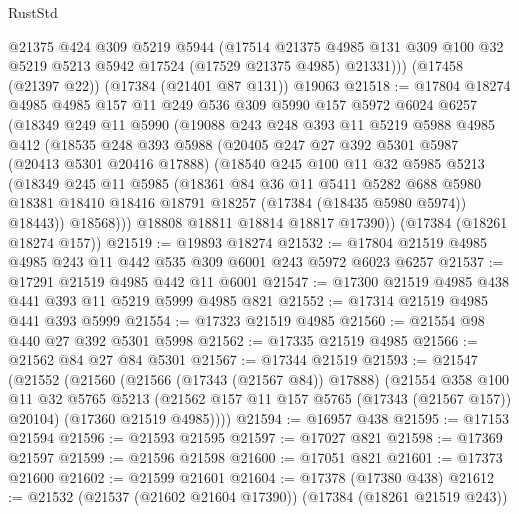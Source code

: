 \begin{lexlean}{RustStd}
\begin{coremodule}
        @21375
        @424
        @309
        @5219
        @5944
        (@17514
          @21375
          @4985
          @131
          @309
          @100
          @32
          @5219
          @5213
          @5942
          @17524
          (@17529 @21375 @4985)
          @21331)))
    (@17458 (@21397 @22))
    (@17384 (@21401 @87 @131))
    @19063
@21518 := @17804
    @18274
    @4985
    @4985
    @157
    @11
    @249
    @536
    @309
    @5990
    @157
    @5972
    @6024
    @6257
    (@18349
      @249
      @11
      @5990
      (@19088
        @243
        @248
        @393
        @11
        @5219
        @5988
        @4985
        @412
        (@18535
          @248
          @393
          @5988
          (@20405
            @247
            @27
            @392
            @5301
            @5987
            (@20413 @5301 @20416 @17888)
            (@18540
              @245
              @100
              @11
              @32
              @5985
              @5213
              (@18349
                @245
                @11
                @5985
                (@18361
                  @84
                  @36
                  @11
                  @5411
                  @5282
                  @688
                  @5980
                  @18381
                  @18410
                  @18416
                  @18791
                  @18257
                  (@17384 (@18435 @5980 @5974))
                  @18443))
              @18568)))
        @18808
        @18811
        @18814
        @18817
        @17390))
    (@17384 (@18261 @18274 @157))
@21519 := @19893 @18274
@21532 := @17804 @21519 @4985 @4985 @243 @11 @442 @535 @309 @6001 @243 @5972 @6023 @6257
@21537 := @17291 @21519 @4985 @442 @11 @6001
@21547 := @17300 @21519 @4985 @438 @441 @393 @11 @5219 @5999 @4985 @821
@21552 := @17314 @21519 @4985 @441 @393 @5999
@21554 := @17323 @21519 @4985
@21560 := @21554 @98 @440 @27 @392 @5301 @5998
@21562 := @17335 @21519 @4985
@21566 := @21562 @84 @27 @84 @5301
@21567 := @17344 @21519
@21593 := @21547
    (@21552
      (@21560
        (@21566 (@17343 (@21567 @84)) @17888)
        (@21554
          @358
          @100
          @11
          @32
          @5765
          @5213
          (@21562 @157 @11 @157 @5765 (@17343 (@21567 @157)) @20104)
          (@17360 @21519 @4985))))
@21594 := @16957 @438
@21595 := @17153 @21594
@21596 := @21593 @21595
@21597 := @17027 @821
@21598 := @17369 @21597
@21599 := @21596 @21598
@21600 := @17051 @821
@21601 := @17373 @21600
@21602 := @21599 @21601
@21604 := @17378 (@17380 @438)
@21612 := @21532 (@21537 (@21602 @21604 @17390)) (@17384 (@18261 @21519 @243))

\end{coremodule}
\end{lexlean}
